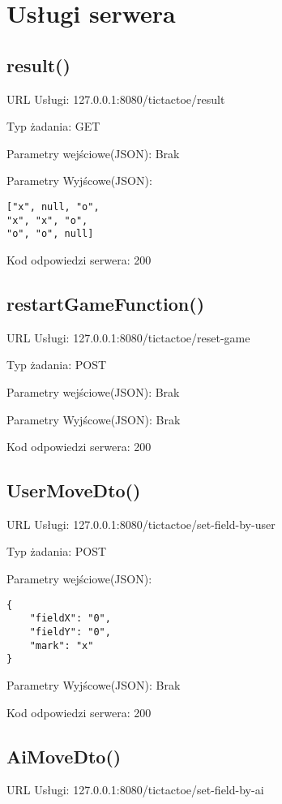 \documentclass{article}
\begin{document}
\section{Usługi serwera}

\subsection{result()}
URL Usługi: 127.0.0.1:8080/tictactoe/result

Typ żadania: GET

Parametry wejściowe(JSON): Brak

Parametry Wyjścowe(JSON):

\begin{lstlisting}
["x", null, "o",
"x", "x", "o",
"o", "o", null]
\end{lstlisting}

Kod odpowiedzi serwera: 200



\subsection{restartGameFunction()}

URL Usługi: 127.0.0.1:8080/tictactoe/reset-game 

Typ żadania: POST 

Parametry wejściowe(JSON): Brak 

Parametry Wyjścowe(JSON): Brak 

Kod odpowiedzi serwera: 200 

\newpage



\subsection{UserMoveDto()}
URL Usługi: 127.0.0.1:8080/tictactoe/set-field-by-user

Typ żadania: POST

Parametry wejściowe(JSON): 

\begin{lstlisting}
{
    "fieldX": "0",
    "fieldY": "0",
    "mark": "x"
}
\end{lstlisting}

Parametry Wyjścowe(JSON): Brak 

Kod odpowiedzi serwera: 200

\subsection{AiMoveDto()}
URL Usługi: 127.0.0.1:8080/tictactoe/set-field-by-ai
\end{document}
